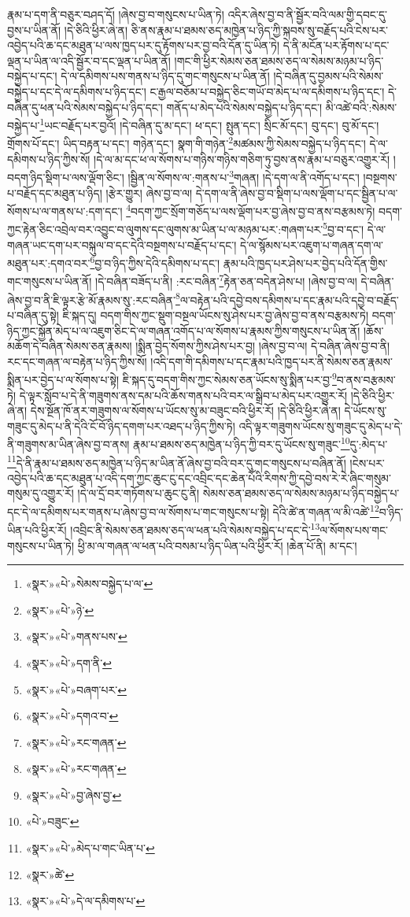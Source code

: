 རྣམ་པ་དག་ནི་བཅུར་བཤད་དོ། །ཞེས་བྱ་བ་གསུངས་པ་ཡིན་ཏེ། འདིར་ཞེས་བྱ་བ་ནི་སྦྱོར་བའི་ལམ་གྱི་དབང་དུ་བྱས་པ་ཡིན་ནོ། །དེ་ཅིའི་ཕྱིར་ཞེ་ན། ཅི་ནས་རྣམ་པ་ཐམས་ཅད་མཁྱེན་པ་ཉིད་ཀྱི་སྐབས་སུ་བརྗོད་པའི་ངེས་པར་འབྱེད་པའི་ཆ་དང་མཐུན་པ་ལས་ཁྱད་པར་དུ་རྟོགས་པར་བྱ་བའི་དོན་དུ་ཡིན་ཏེ། དེ་ནི་མངོན་པར་རྟོགས་པ་དང་ལྡན་པ་ཡིན་ལ་འདི་སྦྱོར་བ་དང་ལྡན་པ་ཡིན་ནོ། །གང་གི་ཕྱིར་སེམས་ཅན་ཐམས་ཅད་ལ་སེམས་མཉམ་པ་ཉིད་བསྐྱེད་པ་དང་། དེ་ལ་དམིགས་པས་གནས་པ་ཉིད་དུ་གང་གསུངས་པ་ཡིན་ནོ། །དེ་བཞིན་དུ་བྱམས་པའི་སེམས་བསྐྱེད་པ་དང་དེ་ལ་དམིགས་པ་ཉིད་དང་། ང་རྒྱལ་བཅོམ་པ་བསྐྱེད་ཅིང་གཡོ་བ་མེད་པ་ལ་དམིགས་པ་ཉིད་དང་། དེ་བཞིན་དུ་ཕན་པའི་སེམས་བསྐྱེད་པ་ཉིད་དང་། གནོད་པ་མེད་པའི་སེམས་བསྐྱེད་པ་ཉིད་དང་། མི་འཚེ་བའི་:སེམས་བསྐྱེད་པ་\footnote{«སྣར་»«པེ་»སེམས་བསྐྱེད་པ་ལ་}ཡང་བརྗོད་པར་བྱའོ། །དེ་བཞིན་དུ་མ་དང་། ཕ་དང་། སྤུན་དང་། སྲིང་མོ་དང་། བུ་དང་། བུ་མོ་དང་། གྲོགས་པོ་དང་། ཡིད་བརྟན་པ་དང་། གཉེན་དང་། སྣག་གི་གཉེན་\footnote{«སྣར་»«པེ་»ཉེ་}མཚམས་ཀྱི་སེམས་བསྐྱེད་པ་ཉིད་དང་། དེ་ལ་དམིགས་པ་ཉིད་ཀྱིས་སོ། །དེ་ལ་མ་དང་ཕ་ལ་སོགས་པ་གཉིས་གཉིས་གཅིག་ཏུ་བྱས་ནས་རྣམ་པ་བཅུར་འགྱུར་རོ། །བདག་ཉིད་སྡིག་པ་ལས་ལྡོག་ཅིང་། །སྦྱིན་ལ་སོགས་ལ་:གནས་པ་\footnote{«སྣར་»«པེ་»གནས་པས་}གཞན། །དེ་དག་ལ་ནི་འགོད་པ་དང་། །བསྔགས་པ་བརྗོད་དང་མཐུན་པ་ཉིད། །རྩེར་གྱུར། ཞེས་བྱ་བ་ལ། དེ་དག་ལ་ནི་ཞེས་བྱ་བ་སྡིག་པ་ལས་ལྡོག་པ་དང་སྦྱིན་པ་ལ་སོགས་པ་ལ་གནས་པ་:དག་དང་། \footnote{«སྣར་»«པེ་»དག་ནི་}བདག་ཀྱང་སྲོག་གཅོད་པ་ལས་ལྡོག་པར་བྱ་ཞེས་བྱ་བ་ནས་བརྩམས་ཏེ། བདག་ཀྱང་རྟེན་ཅིང་འབྲེལ་བར་འབྱུང་བ་ལུགས་དང་ལུགས་མ་ཡིན་པ་ལ་མཉམ་པར་:གཞག་པར་\footnote{«སྣར་»«པེ་»བཞག་པར་}བྱ་བ་དང་། དེ་ལ་གཞན་ཡང་དག་པར་བསྐུལ་བ་དང་དེའི་བསྔགས་པ་བརྗོད་པ་དང་། དེ་ལ་སྙོམས་པར་འཇུག་པ་གཞན་དག་ལ་མཐུན་པར་:དགའ་བར་\footnote{«སྣར་»«པེ་»དགའ་བ་}བྱ་བ་ཉིད་ཀྱིས་དེའི་དམིགས་པ་དང་། རྣམ་པའི་ཁྱད་པར་ཤེས་པར་བྱེད་པའི་དོན་གྱིས་གང་གསུངས་པ་ཡིན་ནོ། །དེ་བཞིན་བཟོད་པ་ནི། :རང་བཞིན་\footnote{«སྣར་»«པེ་»རང་གཞན་}རྟེན་ཅན་བདེན་ཤེས་པ། །ཞེས་བྱ་བ་ལ། དེ་བཞིན་ཞེས་བྱ་བ་ནི་ཇི་ལྟར་རྩེ་མོ་རྣམས་སུ་:རང་བཞིན་\footnote{«སྣར་»«པེ་»རང་གཞན་}ལ་བརྟེན་པའི་དབྱེ་བས་དམིགས་པ་དང་རྣམ་པའི་དབྱེ་བ་བརྗོད་པ་བཞིན་དུ་སྟེ། ཇི་སྐད་དུ། བདག་གིས་ཀྱང་སྡུག་བསྔལ་ཡོངས་སུ་ཤེས་པར་བྱ་ཞེས་བྱ་བ་ནས་བརྩམས་ཏེ། བདག་ཉིད་ཀྱང་སྐྱོན་མེད་པ་ལ་འཇུག་ཅིང་དེ་ལ་གཞན་འགོད་པ་ལ་སོགས་པ་རྣམས་ཀྱིས་གསུངས་པ་ཡིན་ནོ། །ཆོས་མཆོག་དེ་བཞིན་སེམས་ཅན་རྣམས། །སྨིན་བྱེད་སོགས་ཀྱིས་ཤེས་པར་བྱ། །ཞེས་བྱ་བ་ལ། དེ་བཞིན་ཞེས་བྱ་བ་ནི། རང་དང་གཞན་ལ་བརྟེན་པ་ཉིད་ཀྱིས་སོ། །འདི་དག་གི་དམིགས་པ་དང་རྣམ་པའི་ཁྱད་པར་ནི་སེམས་ཅན་རྣམས་སྨིན་པར་བྱེད་པ་ལ་སོགས་པ་སྟེ། ཇི་སྐད་དུ་བདག་གིས་ཀྱང་སེམས་ཅན་ཡོངས་སུ་སྨིན་པར་བྱ་\footnote{«སྣར་»«པེ་»བྱ་ཞེས་བྱ་}བ་ནས་བརྩམས་ཏེ། དེ་ལྟར་སློབ་པ་དེ་ནི་གཟུགས་ནས་དམ་པའི་ཆོས་གནས་པའི་བར་ལ་སྒྲིབ་པ་མེད་པར་འགྱུར་རོ། །དེ་ཅིའི་ཕྱིར་ཞེ་ན། དེས་སྔོན་ཁོ་ནར་གཟུགས་ལ་སོགས་པ་ཡོངས་སུ་མ་བཟུང་བའི་ཕྱིར་རོ། །དེ་ཅིའི་ཕྱིར་ཞེ་ན། དེ་ཡོངས་སུ་གཟུང་དུ་མེད་པ་ནི་དེའི་ངོ་བོ་ཉིད་དགག་པར་འཐད་པ་ཉིད་ཀྱིས་ཏེ། འདི་ལྟར་གཟུགས་ཡོངས་སུ་གཟུང་དུ་མེད་པ་དེ་ནི་གཟུགས་མ་ཡིན་ཞེས་བྱ་བ་ནས། རྣམ་པ་ཐམས་ཅད་མཁྱེན་པ་ཉིད་ཀྱི་བར་དུ་ཡོངས་སུ་གཟུང་\footnote{«པེ་»བཟུང་}དུ་:མེད་པ་\footnote{«སྣར་»«པེ་»མེད་པ་གང་ཡིན་པ་}དེ་ནི་རྣམ་པ་ཐམས་ཅད་མཁྱེན་པ་ཉིད་མ་ཡིན་ནོ་ཞེས་བྱ་བའི་བར་དུ་གང་གསུངས་པ་བཞིན་ནོ། །ངེས་པར་འབྱེད་པའི་ཆ་དང་མཐུན་པ་འདི་དག་ཀྱང་ཆུང་ངུ་དང་འབྲིང་དང་ཆེན་པོའི་རིགས་ཀྱི་དབྱེ་བས་རེ་རེ་ཞིང་གསུམ་གསུམ་དུ་འགྱུར་རོ། །དེ་ལ་དྲོ་བར་གཏོགས་པ་ཆུང་ངུ་ནི། སེམས་ཅན་ཐམས་ཅད་ལ་སེམས་མཉམ་པ་ཉིད་བསྐྱེད་པ་དང་དེ་ལ་དམིགས་པར་གནས་པ་ཞེས་བྱ་བ་ལ་སོགས་པ་གང་གསུངས་པ་སྟེ། དེའི་ཚེ་ན་གཞན་ལ་མི་འཚེ་\footnote{«སྣར་»ཚེ་}བ་ཉིད་ཡིན་པའི་ཕྱིར་རོ། །འབྲིང་ནི་སེམས་ཅན་ཐམས་ཅད་ལ་ཕན་པའི་སེམས་བསྐྱེད་པ་དང་དེ་\footnote{«སྣར་»«པེ་»དེ་ལ་དམིགས་པ་}ལ་སོགས་པས་གང་གསུངས་པ་ཡིན་ཏེ། ཕྱི་མ་ལ་གཞན་ལ་ཕན་པའི་བསམ་པ་ཉིད་ཡིན་པའི་ཕྱིར་རོ། །ཆེན་པོ་ནི། མ་དང་། 